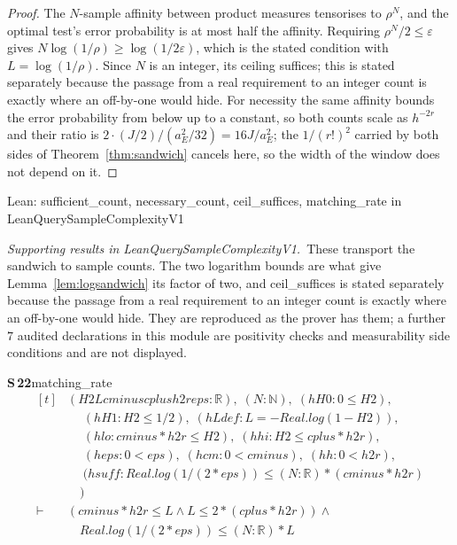 \documentclass[conference]{IEEEtran}
\theoremstyle{definition}
\newcommand{\lean}[1]{\textsf{\footnotesize #1}}
\newcommand{\leanbox}[1]{%
  \par\vspace{2pt}\noindent
  {\footnotesize\textsf{Lean: #1}}\par\vspace{2pt}}
\begin{document}
\begin{proof}
The $N$-sample affinity between product measures tensorises to $\rho^{N}$, and the optimal
test's error probability is at most half the affinity. Requiring $\rho^{N}/2\le\varepsilon$
gives $N\log(1/\rho)\ge\log(1/2\varepsilon)$, which is the stated condition with
$L=\log(1/\rho)$. Since $N$ is an integer, its ceiling suffices; this is stated separately
because the passage from a real requirement to an integer count is exactly where an
off-by-one would hide. For necessity the same affinity bounds the error probability from
below up to a constant, so both counts scale as $h^{-2r}$ and their ratio is
$2\cdot(J/2)/(a_{E}^{2}/32)=16J/a_{E}^{2}$; the $1/(r!)^{2}$ carried by both sides of
Theorem~\ref{thm:sandwich} cancels here, so the width of the window does not depend on it.
\end{proof}

\leanbox{\lean{sufficient\_count}, \lean{necessary\_count}, \lean{ceil\_suffices},
\lean{matching\_rate} in \lean{LeanQuerySampleComplexityV1}}

\noindent\emph{Supporting results in \lean{LeanQuerySampleComplexityV1}.}~These transport the sandwich to sample counts. The two logarithm bounds are what give Lemma~\ref{lem:logsandwich} its factor of two, and \lean{ceil\_suffices} is stated separately because the passage from a real requirement to an integer count is exactly where an off-by-one would hide. They are reproduced as the prover has them; a further $7$ audited declarations in this module are positivity checks and measurability side conditions and are not displayed.

\noindent\textbf{S\,22}\quad\lean{matching\_rate}
{\footnotesize\[ \begin{aligned}[t]
&(\mathit{H2} \mathit{L} \mathit{cminus} \mathit{cplus} \mathit{h2r} \mathit{eps} : \mathbb{R} ),\; (\mathit{N} : \mathbb{N} ),\; (\mathit{hH0} : 0 \leq \mathit{H2}),\\
&\quad \; (\mathit{hH1} : \mathit{H2} \leq 1/2),\; (\mathit{hLdef} : \mathit{L} = -\mathit{Real}.\mathit{log} (1 - \mathit{H2})),\\
&\quad \; (\mathit{hlo} : \mathit{cminus} * \mathit{h2r} \leq \mathit{H2}),\; (\mathit{hhi} : \mathit{H2} \leq \mathit{cplus} * \mathit{h2r}),\\
&\quad \; (\mathit{heps} : 0 < \mathit{eps}),\; (\mathit{hcm} : 0 < \mathit{cminus}),\; (\mathit{hh} : 0 < \mathit{h2r}),\\
&\quad \; (\mathit{hsuff} : \mathit{Real}.\mathit{log} (1 / (2 * \mathit{eps})) \leq (\mathit{N} : \mathbb{R} ) * (\mathit{cminus} * \mathit{h2r})\\
&\quad )\\
\vdash\;&(\mathit{cminus} * \mathit{h2r} \leq \mathit{L} \wedge \mathit{L} \leq 2 * (\mathit{cplus} * \mathit{h2r})) \wedge\\
&\quad \mathit{Real}.\mathit{log} (1 / (2 * \mathit{eps})) \leq (\mathit{N} : \mathbb{R} ) * \mathit{L}
\end{aligned} \]}
\end{document}
